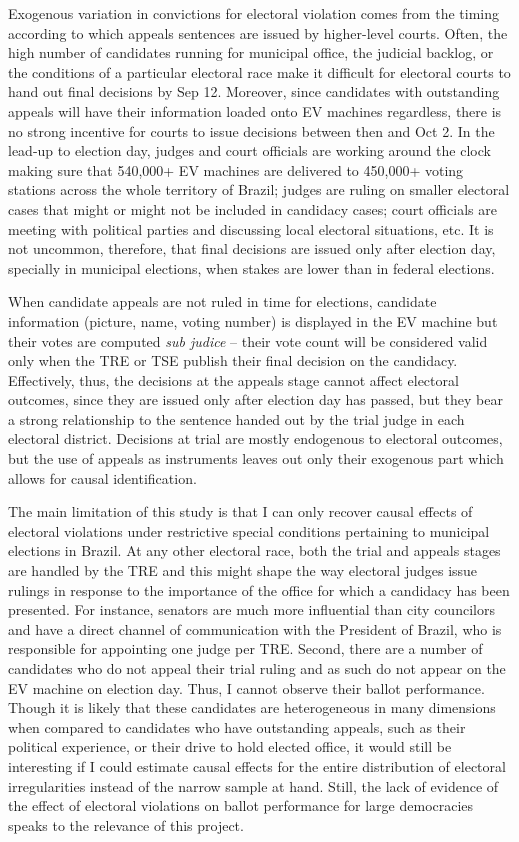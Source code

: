 \documentclass[11pt]{article}
\begin{document}
Exogenous variation in convictions for electoral violation comes from the timing according to which appeals sentences are issued by higher-level courts. Often, the high number of candidates running for municipal office, the judicial backlog, or the conditions of a particular electoral race make it difficult for electoral courts to hand out final decisions by Sep 12. Moreover, since candidates with outstanding appeals will have their information loaded onto EV machines regardless, there is no strong incentive for courts to issue decisions between then and Oct 2. In the lead-up to election day, judges and court officials are working around the clock making sure that 540,000+ EV machines are delivered to 450,000+ voting stations across the whole territory of Brazil; judges are ruling on smaller electoral cases that might or might not be included in candidacy cases; court officials are meeting with political parties and discussing local electoral situations, etc. It is not uncommon, therefore, that final decisions are issued only after election day, specially in municipal elections, when stakes are lower than in federal elections.

When candidate appeals are not ruled in time for elections, candidate information (picture, name, voting number) is displayed in the EV machine but their votes are computed \emph{sub judice} -- their vote count will be considered valid only when the TRE or TSE publish their final decision on the candidacy. Effectively, thus, the decisions at the appeals stage cannot affect electoral outcomes, since they are issued only after election day has passed, but they bear a strong relationship to the sentence handed out by the trial judge in each electoral district. Decisions at trial are mostly endogenous to electoral outcomes, but the use of appeals as instruments leaves out only their exogenous part which allows for causal identification.

The main limitation of this study is that I can only recover causal effects of electoral violations under restrictive special conditions pertaining to municipal elections in Brazil. At any other electoral race, both the trial and appeals stages are handled by the TRE and this might shape the way electoral judges issue rulings in response to the importance of the office for which a candidacy has been presented. For instance, senators are much more influential than city councilors and have a direct channel of communication with the President of Brazil, who is responsible for appointing one judge per TRE. Second, there are a number of candidates who do not appeal their trial ruling and as such do not appear on the EV machine on election day. Thus, I cannot observe their ballot performance. Though it is likely that these candidates are heterogeneous in many dimensions when compared to candidates who have outstanding appeals, such as their political experience, or their drive to hold elected office, it would still be interesting if I could estimate causal effects for the entire distribution of electoral irregularities instead of the narrow sample at hand. Still, the lack of evidence of the effect of electoral violations on ballot performance for large democracies speaks to the relevance of this project.
\end{document}
